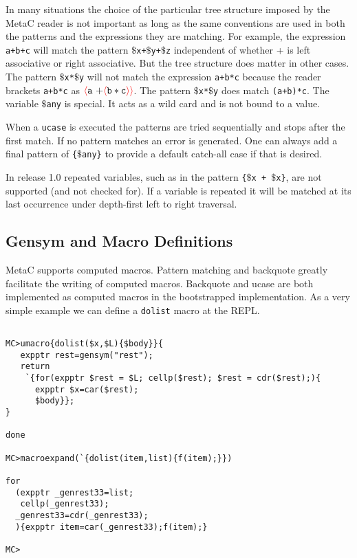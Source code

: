 \documentclass{article}
\newcommand{\fopen}{{\color{red} \langle}}
\newcommand{\fclose}{{\color{red} \rangle}}
\begin{document}
In many situations the choice of the particular tree structure imposed by the MetaC reader is not important as long as the same conventions are used in both the patterns and the expressions
they are matching.  For example, the expression {\tt a+b+c} will match the pattern
{\tt $\$$x+$\$$y+$\$$z} independent of whether + is left associative or right associative.  But the tree structure does matter in other cases.  The pattern {\tt $\$$x*$\$$y}
will not match the expression {\tt a+b*c} because the reader brackets {\tt a+b*c} as  $\fopen \mathtt{a~+} \fopen \mathtt{b * c} \fclose\fclose$. The pattern {\tt $\$$x*$\$$y} does match {\tt (a+b)*c}.
The variable {\tt $\$$any} is special.  It acts as a wild card and is not bound to a value.

When a {\tt ucase} is executed the patterns are tried sequentially and stops after the first match.  If no pattern matches an error is generated.
One can always add a final pattern of {\tt \{$\$$any\}} to provide a default
catch-all case if that is desired.

In release 1.0 repeated variables, such as in the pattern {\tt \{$\$$x + $\$$x\}}, are not supported (and not checked for).
If a variable is repeated it will be matched at its last occurrence under depth-first left to right traversal.

\subsection{Gensym and Macro Definitions}

MetaC supports computed macros.  Pattern matching and backquote greatly facilitate the writing of computed macros.  Backquote and ucase are both implemented as computed macros in the bootstrapped implementation. As a very simple example we can define a {\tt dolist} macro at the REPL.

\begin{verbatim}

MC>umacro{dolist($x,$L){$body}}{
   expptr rest=gensym("rest");
   return
    `{for(expptr $rest = $L; cellp($rest); $rest = cdr($rest);){
      expptr $x=car($rest);
      $body}};
}

done

MC>macroexpand(`{dolist(item,list){f(item);}})

for
  (expptr _genrest33=list;
   cellp(_genrest33);
  _genrest33=cdr(_genrest33);
  ){expptr item=car(_genrest33);f(item);}

MC>
\end{verbatim}
\end{document}
